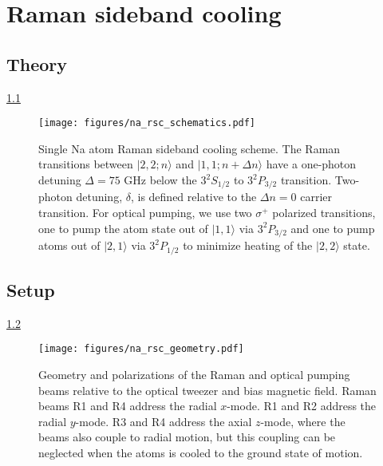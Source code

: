 
\chapter{Raman sideband cooling}

\section{Theory}

\ref{fig:na-rsc-schematics}

\begin{figure}
  \centering
  \texttt{[image: figures/na\_rsc\_schematics.pdf]}
  \caption[Schematics of Raman sideband cooling for Sodium.]{
    Single Na atom Raman sideband cooling scheme.
    The Raman transitions between $|2,2;n\rangle$ and $|1,1;n+\Delta n\rangle$
    have a one-photon detuning $\Delta=75$ GHz below the $3^2S_{1/2}$ to $3^2P_{3/2}$ transition.
    Two-photon detuning, $\delta$, is defined relative to the $\Delta n=0$ carrier transition.
    For optical pumping, we use two $\sigma^+$ polarized transitions,
    one to pump the atom state out of $|1,1\rangle$ via $3^2P_{3/2}$
    and one to pump atoms out of $|2,1\rangle$ via $3^2P_{1/2}$
    to minimize heating of the $|2,2\rangle$ state.
    \label{fig:na-rsc-schematics}}
\end{figure}

\section{Setup}

\ref{fig:na-rsc-geometry}

\begin{figure}
  \centering
  \texttt{[image: figures/na\_rsc\_geometry.pdf]}
  \caption[Beams and field geometry for Sodium Raman sideband cooling]{
    Geometry and polarizations of the Raman and optical pumping beams relative to the
    optical tweezer and bias magnetic field.
    Raman beams R1 and R4 address the radial $x$-mode.
    R1 and R2 address the radial $y$-mode.
    R3 and R4 address the axial $z$-mode, where the beams also couple to radial motion,
    but this coupling can be neglected when the atoms is cooled to the ground state of motion.
    \label{fig:na-rsc-geometry}}
\end{figure}

